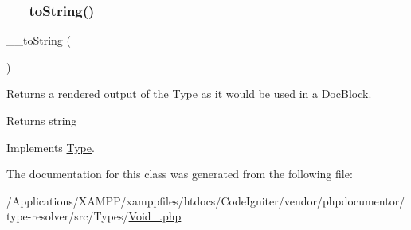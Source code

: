\subsubsection{\texorpdfstring{\+\_\+\+\_\+to\+String()}{\_\_toString()}}
{\footnotesize\ttfamily \+\_\+\+\_\+to\+String (\begin{DoxyParamCaption}{ }\end{DoxyParamCaption})}

Returns a rendered output of the \mbox{\hyperlink{interfacephp_documentor_1_1_reflection_1_1_type}{Type}} as it would be used in a \mbox{\hyperlink{classphp_documentor_1_1_reflection_1_1_doc_block}{Doc\+Block}}.

\begin{DoxyReturn}{Returns}
string 
\end{DoxyReturn}


Implements \mbox{\hyperlink{interfacephp_documentor_1_1_reflection_1_1_type_a7516ca30af0db3cdbf9a7739b48ce91d}{Type}}.



The documentation for this class was generated from the following file\+:\begin{DoxyCompactItemize}
\item 
/\+Applications/\+X\+A\+M\+P\+P/xamppfiles/htdocs/\+Code\+Igniter/vendor/phpdocumentor/type-\/resolver/src/\+Types/\mbox{\hyperlink{_void___8php}{Void\+\_\+.\+php}}\end{DoxyCompactItemize}
